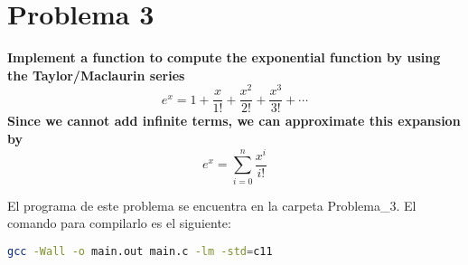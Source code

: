 \section*{Problema 3}
\textbf{Implement a function to compute the exponential function by using the
    Taylor/Maclaurin series
    \begin{equation*}
        e^x= 1+ \frac{x}{1!}+\frac{x^2}{2!}+\frac{x^3}{3!}+ \cdots
    \end{equation*}
    Since we cannot add infinite terms, we can approximate this expansion by
    \begin{equation*}
        e^x= \sum_{i=0}^n \frac{x^i}{i!}
    \end{equation*}
}

El programa de este problema se encuentra en la carpeta \textcolor{citecolor}{Problema\_3}. El comando para compilarlo es el siguiente:

\begin{lstlisting}[language=bash]
    gcc -Wall -o main.out main.c -lm -std=c11
\end{lstlisting}
